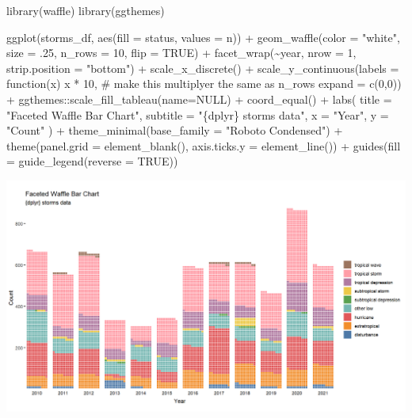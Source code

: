 \documentclass[
  letterpaper,
  DIV=11,
  numbers=noendperiod]{scrreprt}
\newenvironment{Shaded}{\begin{snugshade}}{\end{snugshade}}
\newcommand{\AttributeTok}[1]{\textcolor[rgb]{0.40,0.45,0.13}{#1}}
\newcommand{\CommentTok}[1]{\textcolor[rgb]{0.37,0.37,0.37}{#1}}
\newcommand{\ConstantTok}[1]{\textcolor[rgb]{0.56,0.35,0.01}{#1}}
\newcommand{\ControlFlowTok}[1]{\textcolor[rgb]{0.00,0.23,0.31}{#1}}
\newcommand{\DecValTok}[1]{\textcolor[rgb]{0.68,0.00,0.00}{#1}}
\newcommand{\FunctionTok}[1]{\textcolor[rgb]{0.28,0.35,0.67}{#1}}
\newcommand{\NormalTok}[1]{\textcolor[rgb]{0.00,0.23,0.31}{#1}}
\newcommand{\SpecialCharTok}[1]{\textcolor[rgb]{0.37,0.37,0.37}{#1}}
\newcommand{\StringTok}[1]{\textcolor[rgb]{0.13,0.47,0.30}{#1}}
\begin{document}
\begin{Shaded}
\begin{Highlighting}[]
\FunctionTok{library}\NormalTok{(waffle)}
\FunctionTok{library}\NormalTok{(ggthemes)}

\FunctionTok{ggplot}\NormalTok{(storms\_df, }\FunctionTok{aes}\NormalTok{(}\AttributeTok{fill =}\NormalTok{ status, }\AttributeTok{values =}\NormalTok{ n)) }\SpecialCharTok{+}
  \FunctionTok{geom\_waffle}\NormalTok{(}\AttributeTok{color =} \StringTok{"white"}\NormalTok{, }\AttributeTok{size =}\NormalTok{ .}\DecValTok{25}\NormalTok{, }\AttributeTok{n\_rows =} \DecValTok{10}\NormalTok{, }\AttributeTok{flip =} \ConstantTok{TRUE}\NormalTok{) }\SpecialCharTok{+}
  \FunctionTok{facet\_wrap}\NormalTok{(}\SpecialCharTok{\textasciitilde{}}\NormalTok{year, }\AttributeTok{nrow =} \DecValTok{1}\NormalTok{, }\AttributeTok{strip.position =} \StringTok{"bottom"}\NormalTok{) }\SpecialCharTok{+}
  \FunctionTok{scale\_x\_discrete}\NormalTok{() }\SpecialCharTok{+}
  \FunctionTok{scale\_y\_continuous}\NormalTok{(}\AttributeTok{labels =} \ControlFlowTok{function}\NormalTok{(x) x }\SpecialCharTok{*} \DecValTok{10}\NormalTok{, }\CommentTok{\# make this multiplyer the same as n\_rows}
                     \AttributeTok{expand =} \FunctionTok{c}\NormalTok{(}\DecValTok{0}\NormalTok{,}\DecValTok{0}\NormalTok{)) }\SpecialCharTok{+}
\NormalTok{  ggthemes}\SpecialCharTok{::}\FunctionTok{scale\_fill\_tableau}\NormalTok{(}\AttributeTok{name=}\ConstantTok{NULL}\NormalTok{) }\SpecialCharTok{+}
  \FunctionTok{coord\_equal}\NormalTok{() }\SpecialCharTok{+}
  \FunctionTok{labs}\NormalTok{(}
    \AttributeTok{title =} \StringTok{"Faceted Waffle Bar Chart"}\NormalTok{,}
    \AttributeTok{subtitle =} \StringTok{"\{dplyr\} storms data"}\NormalTok{,}
    \AttributeTok{x =} \StringTok{"Year"}\NormalTok{,}
    \AttributeTok{y =} \StringTok{"Count"}
\NormalTok{  ) }\SpecialCharTok{+}
  \FunctionTok{theme\_minimal}\NormalTok{(}\AttributeTok{base\_family =} \StringTok{"Roboto Condensed"}\NormalTok{) }\SpecialCharTok{+}
  \FunctionTok{theme}\NormalTok{(}\AttributeTok{panel.grid =} \FunctionTok{element\_blank}\NormalTok{(), }\AttributeTok{axis.ticks.y =} \FunctionTok{element\_line}\NormalTok{()) }\SpecialCharTok{+}
  \FunctionTok{guides}\NormalTok{(}\AttributeTok{fill =} \FunctionTok{guide\_legend}\NormalTok{(}\AttributeTok{reverse =} \ConstantTok{TRUE}\NormalTok{))}
\end{Highlighting}
\end{Shaded}

\includegraphics{./img/waf.png}
\end{document}
